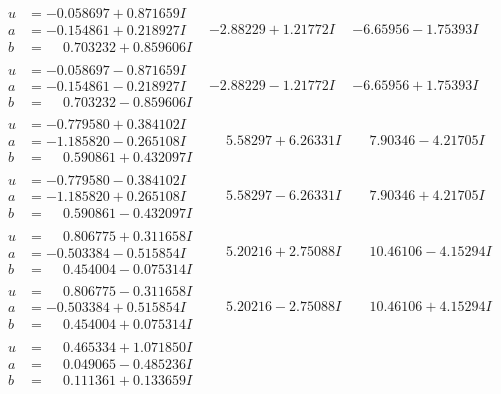 \documentclass[1p]{elsarticle_modified}
\theoremstyle{definition}
\begin{document}
$$\begin{array}{c|c|c}
\begin{aligned}
u &= -0.058697 + 0.871659 I \\
a &= -0.154861 + 0.218927 I \\
b &= \phantom{-}0.703232 + 0.859606 I\end{aligned}
 & -2.88229 + 1.21772 I & -6.65956 - 1.75393 I \\ \hline\begin{aligned}
u &= -0.058697 - 0.871659 I \\
a &= -0.154861 - 0.218927 I \\
b &= \phantom{-}0.703232 - 0.859606 I\end{aligned}
 & -2.88229 - 1.21772 I & -6.65956 + 1.75393 I \\ \hline\begin{aligned}
u &= -0.779580 + 0.384102 I \\
a &= -1.185820 - 0.265108 I \\
b &= \phantom{-}0.590861 + 0.432097 I\end{aligned}
 & \phantom{-}5.58297 + 6.26331 I & \phantom{-}7.90346 - 4.21705 I \\ \hline\begin{aligned}
u &= -0.779580 - 0.384102 I \\
a &= -1.185820 + 0.265108 I \\
b &= \phantom{-}0.590861 - 0.432097 I\end{aligned}
 & \phantom{-}5.58297 - 6.26331 I & \phantom{-}7.90346 + 4.21705 I \\ \hline\begin{aligned}
u &= \phantom{-}0.806775 + 0.311658 I \\
a &= -0.503384 - 0.515854 I \\
b &= \phantom{-}0.454004 - 0.075314 I\end{aligned}
 & \phantom{-}5.20216 + 2.75088 I & \phantom{-}10.46106 - 4.15294 I \\ \hline\begin{aligned}
u &= \phantom{-}0.806775 - 0.311658 I \\
a &= -0.503384 + 0.515854 I \\
b &= \phantom{-}0.454004 + 0.075314 I\end{aligned}
 & \phantom{-}5.20216 - 2.75088 I & \phantom{-}10.46106 + 4.15294 I \\ \hline\begin{aligned}
u &= \phantom{-}0.465334 + 1.071850 I \\
a &= \phantom{-}0.049065 - 0.485236 I \\
b &= \phantom{-}0.111361 + 0.133659 I\end{aligned}

\end{array}$$
\end{document}
